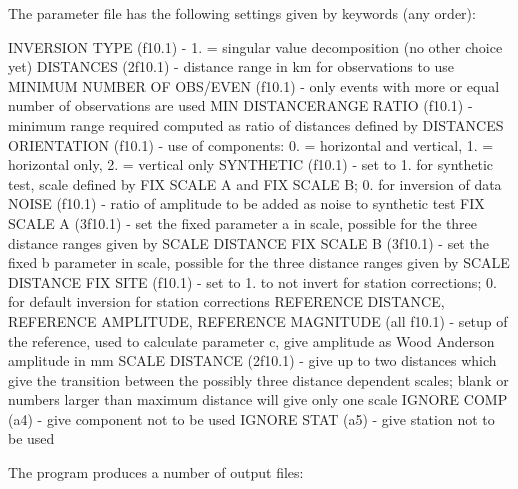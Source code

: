 The parameter file has the following settings given by keywords (any order):

INVERSION TYPE (f10.1) - 1. = singular value decomposition (no other choice yet)\newline
DISTANCES (2f10.1) - distance range in km for observations to use\newline
MINIMUM NUMBER OF OBS/EVEN (f10.1) - only events with more or equal number 
of observations are used\newline
MIN DISTANCERANGE RATIO (f10.1) - minimum range required computed as ratio 
of distances defined by DISTANCES\newline
ORIENTATION (f10.1) - use of components: 0. = horizontal and vertical, 
1. = horizontal only, 2. = vertical only\newline
SYNTHETIC (f10.1) - set to 1. for synthetic test, scale defined by FIX SCALE A and FIX SCALE B; 0. for inversion of data\newline
NOISE (f10.1) - ratio of amplitude to be added as noise to synthetic test\newline
FIX SCALE A (3f10.1) - set the fixed parameter a in scale, possible for the 
three distance ranges given by SCALE DISTANCE\newline
FIX SCALE B (3f10.1) - set the fixed b parameter in scale, possible for the 
three distance ranges given by SCALE DISTANCE\newline
FIX SITE (f10.1) - set to 1. to not invert for station corrections; 0. for 
default inversion for station corrections\newline
REFERENCE DISTANCE, REFERENCE AMPLITUDE, REFERENCE MAGNITUDE 
(all f10.1) - setup of the reference, used to calculate parameter c, 
give amplitude as Wood Anderson amplitude in mm\newline
SCALE DISTANCE (2f10.1) - give up to two distances which give the 
transition between the possibly three distance dependent scales; blank 
or numbers larger than maximum distance will give only one scale\newline
IGNORE COMP (a4)  - give component not to be used\newline
IGNORE STAT (a5) - give station not to be used\newline


The program produces a number of output files:

